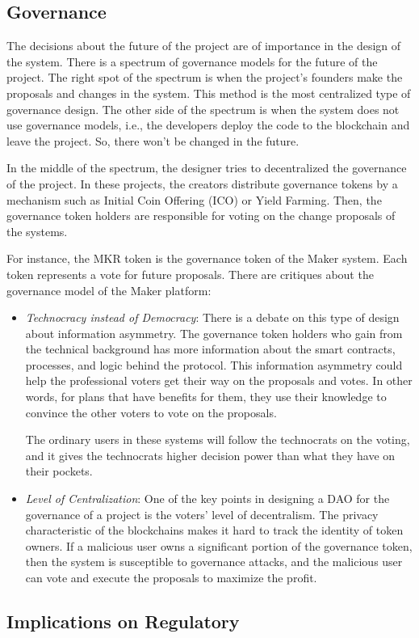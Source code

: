 \subsection{Governance}
The decisions about the future of the project are of importance in the design of the system. There is a spectrum of governance models for the future of the project. The right spot of the spectrum is when the project's founders make the proposals and changes in the system. This method is the most centralized type of governance design. The other side of the spectrum is when the system does not use governance models, i.e., the developers deploy the code to the blockchain and leave the project. So, there won't be changed in the future.

In the middle of the spectrum,  the designer tries to decentralized the governance of the project. In these projects, the creators distribute governance tokens by a mechanism such as Initial Coin Offering (ICO) or Yield Farming. Then, the governance token holders are responsible for voting on the change proposals of the systems.

For instance, the MKR token is the governance token of the Maker system. Each token represents a vote for future proposals. There are critiques about the governance model of the Maker platform:

\begin{itemize}
	\item \emph{Technocracy instead of Democracy}: There is a debate on this type of design about information asymmetry. The governance token holders who gain from the technical background has more information about the smart contracts, processes, and logic behind the protocol. This information asymmetry could help the professional voters get their way on the proposals and votes. In other words, for plans that have benefits for them, they use their knowledge to convince the other voters to vote on the proposals.
	
The ordinary users in these systems will follow the technocrats on the voting, and it gives the technocrats higher decision power than what they have on their pockets.   
	\item \emph{Level of Centralization}: One of the key points in designing a DAO for the governance of a project is the voters' level of decentralism. The privacy characteristic of the blockchains makes it hard to track the identity of token owners. If a malicious user owns a significant portion of the governance token, then the system is susceptible to governance attacks, and the malicious user can vote and execute the proposals to maximize the profit. 
\end{itemize}

\subsection{Implications on Regulatory}